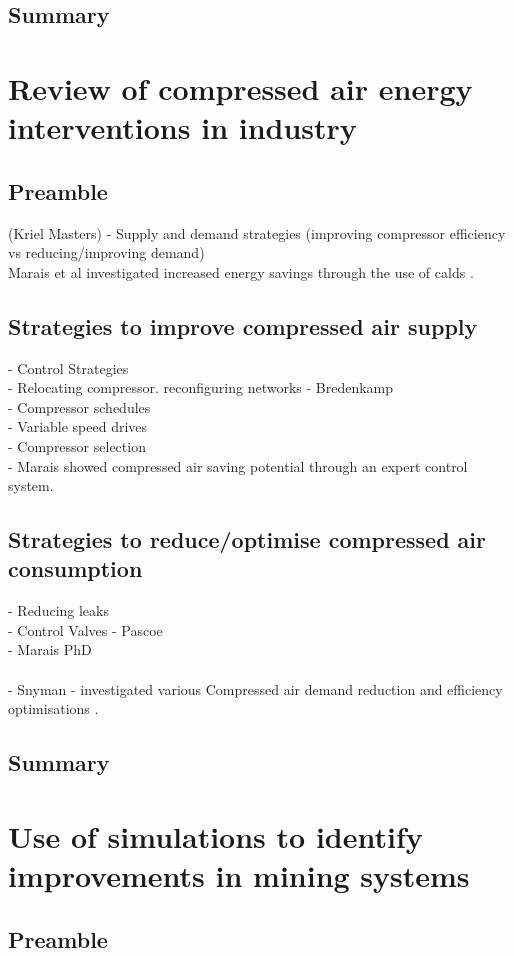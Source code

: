 	\subsection{Summary}
\section{Review of compressed air energy interventions in industry}
	\subsection{Preamble}
	(Kriel Masters)
	- Supply and demand strategies (improving compressor efficiency vs reducing/improving demand)\\
	Marais et al investigated increased energy savings through the use of \gls{calds} \cite{marais2009increased}.
	\subsection{Strategies to improve compressed air supply}
		- Control Strategies\\
		- Relocating compressor. reconfiguring networks - Bredenkamp\\
		- Compressor schedules\\
		- Variable speed drives\\
		- Compressor selection\\
		- Marais showed compressed air saving potential through an expert control 	system.\cite{marais2010expert}\\
	\subsection{Strategies to reduce/optimise compressed air consumption}
		- Reducing leaks\\
		- Control Valves - Pascoe\\
		- Marais PhD\\
\\
		- Snyman - investigated various Compressed air demand reduction and efficiency optimisations \cite{Snyman2011Masters}.
	\subsection{Summary}
\section{Use of simulations to identify improvements in mining systems}
	\subsection{Preamble}
